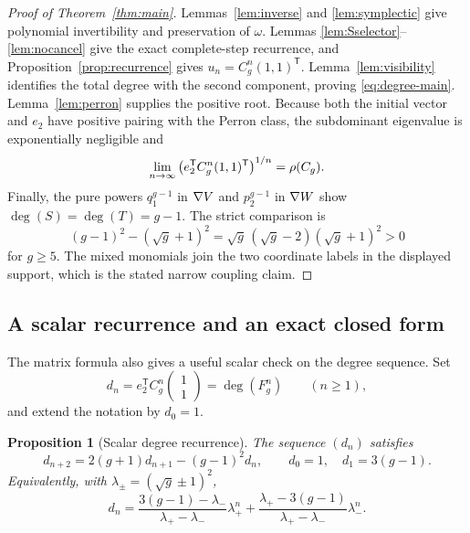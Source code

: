 \documentclass[11pt]{article}
\newtheorem{proposition}[theorem]{Proposition}
\theoremstyle{remark}
\numberwithin{equation}{section}
\begin{document}
\begin{proof}[Proof of Theorem~\ref{thm:main}]
Lemmas~\ref{lem:inverse} and \ref{lem:symplectic} give polynomial
invertibility and preservation of \(\omega\).  Lemmas
\ref{lem:Sselector}--\ref{lem:nocancel} give the exact complete-step recurrence,
and Proposition~\ref{prop:recurrence} gives
\(u_n=C_g^n(1,1)^{\mathsf T}\).  Lemma~\ref{lem:visibility} identifies the
total degree with the second component, proving \eqref{eq:degree-main}.
Lemma~\ref{lem:perron} supplies the positive root.  Because both the initial
vector and \(e_2\) have positive pairing with the Perron class, the
subdominant eigenvalue is exponentially negligible and
\[
 \lim_{n\to\infty}
 \left(e_2^{\mathsf T}C_g^n(1,1)^{\mathsf T}\right)^{1/n}
 =\rho(C_g).
\]
Finally, the pure powers \(q_1^{g-1}\) in \(\nabla V\) and \(p_2^{g-1}\) in
\(\nabla W\) show \(\deg(S)=\deg(T)=g-1\).  The strict comparison is
\[
 (g-1)^2-(\sqrt g+1)^2
 =\sqrt g\,(\sqrt g-2)(\sqrt g+1)^2>0
\]
for \(g\geq5\).  The mixed monomials join the two coordinate labels in the
displayed support, which is the stated narrow coupling claim.
\end{proof}

\subsection{A scalar recurrence and an exact closed form}

The matrix formula also gives a useful scalar check on the degree sequence.  Set
\[
 d_n=e_2^{\mathsf T}C_g^n\begin{pmatrix}1\\1\end{pmatrix}
 =\deg(F_g^n)\qquad(n\geq1),
\]
and extend the notation by \(d_0=1\).

\begin{proposition}[Scalar degree recurrence]\label{prop:scalar}
The sequence \((d_n)\) satisfies
\[
 d_{n+2}=2(g+1)d_{n+1}-(g-1)^2d_n,
 \qquad d_0=1,\quad d_1=3(g-1).
\]
Equivalently, with
\(\lambda_\pm=(\sqrt g\pm1)^2\),
\[
 d_n=
 \frac{3(g-1)-\lambda_-}{\lambda_+-\lambda_-}\lambda_+^n
 +\frac{\lambda_+-3(g-1)}{\lambda_+-\lambda_-}\lambda_-^n.
\]
\end{proposition}
\end{document}
